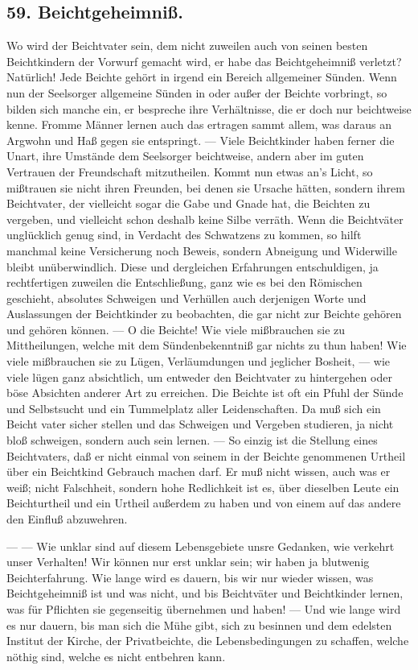 \subsection*{59. Beichtgeheimniß.}

Wo wird der Beichtvater sein, dem nicht zuweilen auch von seinen besten Beichtkindern der Vorwurf gemacht wird, er habe das Beichtgeheimniß verletzt? Natürlich! Jede Beichte
gehört in irgend ein Bereich allgemeiner Sünden. Wenn nun der Seelsorger allgemeine Sünden in oder außer der Beichte vorbringt, so bilden sich manche ein, er bespreche ihre Verhältnisse, die er doch nur beichtweise kenne. Fromme Männer lernen auch das ertragen sammt allem, was daraus an Argwohn und Haß gegen sie entspringt. — Viele Beichtkinder haben ferner die Unart, ihre Umstände dem Seelsorger beichtweise, andern aber im guten Vertrauen der Freundschaft mitzutheilen. Kommt nun etwas an’s Licht, so mißtrauen sie nicht ihren Freunden, bei denen sie Ursache hätten, sondern ihrem Beichtvater, der vielleicht sogar die Gabe und Gnade hat, die Beichten zu vergeben, und vielleicht schon deshalb keine Silbe verräth. Wenn die Beichtväter unglücklich genug sind, in Verdacht des Schwatzens zu kommen, so hilft manchmal keine Versicherung noch Beweis, sondern Abneigung und Widerwille bleibt unüberwindlich. Diese und dergleichen Erfahrungen entschuldigen, ja rechtfertigen zuweilen die Entschließung, ganz wie es bei den Römischen geschieht, absolutes Schweigen und Verhüllen auch derjenigen Worte und Auslassungen der Beichtkinder zu beobachten, die gar nicht zur Beichte gehören und gehören können. — O die Beichte! Wie viele mißbrauchen sie zu Mittheilungen, welche mit dem Sündenbekenntniß gar nichts zu thun haben! Wie viele mißbrauchen sie zu Lügen, Verläumdungen und jeglicher Bosheit, — wie viele lügen ganz absichtlich, um entweder den Beichtvater zu hintergehen oder böse Absichten anderer Art zu erreichen. Die Beichte ist oft ein Pfuhl der Sünde und Selbstsucht und ein Tummelplatz aller Leidenschaften. Da muß sich ein Beicht%
vater sicher stellen und das Schweigen und Vergeben studieren, ja nicht bloß schweigen, sondern auch sein lernen. — So einzig ist die Stellung eines Beichtvaters, daß er nicht einmal von seinem in der Beichte genommenen Urtheil über ein Beichtkind Gebrauch machen darf. Er muß nicht wissen, auch was er weiß; nicht Falschheit, sondern hohe Redlichkeit ist es, über dieselben Leute ein Beichturtheil und ein Urtheil außerdem zu haben und von einem auf das andere den Einfluß abzuwehren.

— — Wie unklar sind auf diesem Lebensgebiete unsre Gedanken, wie verkehrt unser Verhalten! Wir können nur erst unklar sein; wir haben ja blutwenig Beichterfahrung. Wie lange wird es dauern, bis wir nur wieder wissen, was Beichtgeheimniß ist und was nicht, und bis Beichtväter und Beichtkinder lernen, was für Pflichten sie gegenseitig übernehmen und haben! — Und wie lange wird es nur dauern, bis man sich die Mühe gibt, sich zu besinnen und dem edelsten Institut der Kirche, der Privatbeichte, die Lebensbedingungen zu schaffen, welche nöthig sind, welche es nicht entbehren kann.

